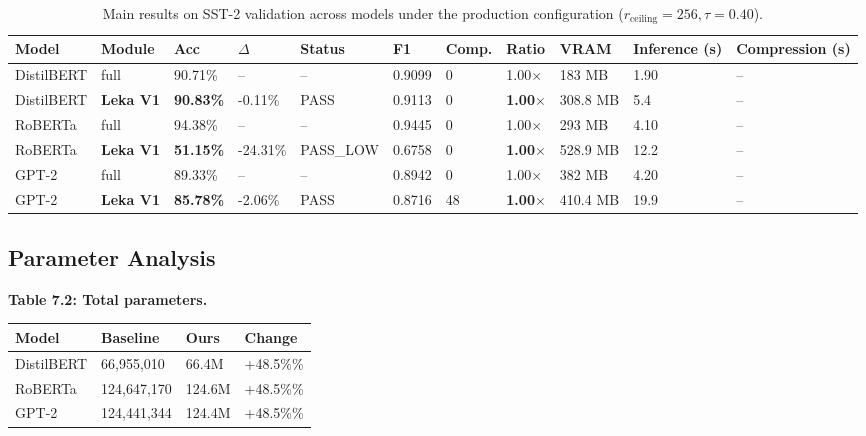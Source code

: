 \begin{table}[t]
\centering
\small
\begin{tabular}{lllllllllll}
\toprule
\textbf{Model} & \textbf{Module} & \textbf{Acc} & \textbf{$\Delta$} & \textbf{Status} & \textbf{F1} & \textbf{Comp.} & \textbf{Ratio} & \textbf{VRAM} & \textbf{Inference (s)} & \textbf{Compression (s)} \\
\midrule
DistilBERT & full & 90.71\% & -- & -- & 0.9099 & 0 & 1.00$\times$ & 183 MB & 1.90 & -- \\
DistilBERT & \textbf{Leka V1} & \textbf{90.83\%} & -0.11\% & PASS & 0.9113 & 0 & \textbf{1.00$\times$} & 308.8 MB & 5.4 & -- \\
RoBERTa & full & 94.38\% & -- & -- & 0.9445 & 0 & 1.00$\times$ & 293 MB & 4.10 & -- \\
RoBERTa & \textbf{Leka V1} & \textbf{51.15\%} & -24.31\% & PASS\_LOW & 0.6758 & 0 & \textbf{1.00$\times$} & 528.9 MB & 12.2 & -- \\
GPT-2 & full & 89.33\% & -- & -- & 0.8942 & 0 & 1.00$\times$ & 382 MB & 4.20 & -- \\
GPT-2 & \textbf{Leka V1} & \textbf{85.78\%} & -2.06\% & PASS & 0.8716 & 48 & \textbf{1.00$\times$} & 410.4 MB & 19.9 & -- \\
\bottomrule
\end{tabular}
\caption{Main results on SST-2 validation across models under the production configuration ($r_{\mathrm{ceiling}}=256, \tau=0.40$).}
\label{tab:main_sst2}
\end{table}

\subsection{Parameter Analysis}

\textbf{Table 7.2: Total parameters.}

\begin{table}[H]
\centering
\small
\begin{tabular}{llll}
\toprule
\textbf{Model} & \textbf{Baseline} & \textbf{Ours} & \textbf{Change} \\
\midrule
DistilBERT & 66,955,010 & 66.4M & +48.5\%\% \\
RoBERTa & 124,647,170 & 124.6M & +48.5\%\% \\
GPT-2 & 124,441,344 & 124.4M & +48.5\%\% \\
\bottomrule
\end{tabular}
\end{table}

